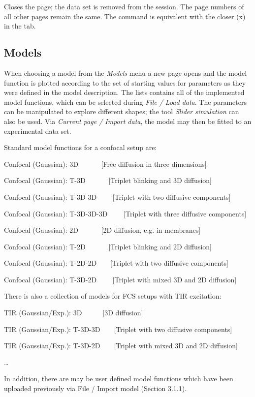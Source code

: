 Closes the page; the data set is removed from the session. The page numbers of all other pages remain the same. The command is equivalent with the closer (x) in the tab. 

\subsection{Models}

When choosing a model from the \textit{Models} menu a new page opens and the model function is plotted according to the set of starting values for parameters as they were defined in the model description. The lists contains all of the implemented model functions, which can be selected during \textit{File / Load data}. The parameters can be manipulated to explore different shapes; the tool \textit{Slider simulation} can also be used. Via \textit{Current page / Import data}, the model may then be fitted to an experimental data set. 

Standard model functions for a confocal setup are:

Confocal (Gaussian): 3D \ \ \ \ \ \ [Free diffusion in three dimensions]

Confocal (Gaussian): T-3D \ \ \ \ \ \ [Triplet blinking and 3D diffusion]

Confocal (Gaussian): T-3D-3D \ \ \ \ [Triplet with two diffusive components]

Confocal (Gaussian): T-3D-3D-3D \ \ \ \ [Triplet with three diffusive components]

Confocal (Gaussian): 2D \ \ \ \ \ \ [2D diffusion, e.g. in membranes]

Confocal (Gaussian): T-2D \ \ \ \ \ \ [Triplet blinking and 2D diffusion]

Confocal (Gaussian): T-2D-2D\ \ \ \ [Triplet with two diffusive components]

Confocal (Gaussian): T-3D-2D \ \ \ \ [Triplet with mixed 3D and 2D diffusion]

There is also a collection of models for FCS setups with TIR excitation:

TIR (Gaussian/Exp.): 3D\ \ \ \ \ \ [3D diffusion]

TIR (Gaussian/Exp.): T-3D-3D\ \ \ \ [Triplet with two diffusive components]

TIR (Gaussian/Exp.): T-3D-2D\ \ \ \ [Triplet with mixed 3D and 2D diffusion]

… 

In addition, there are may be user defined model functions which have been uploaded previously via File / Import model (Section 3.1.1).

